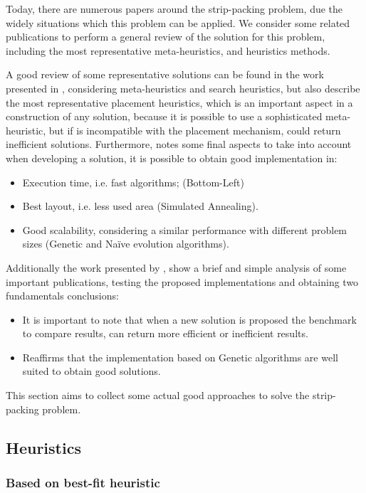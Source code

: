 Today, there are numerous papers around the strip-packing problem,
due the widely situations which this problem can be applied.
We consider some related publications to perform a general review
of the solution for this problem, including the most representative
meta-heuristics, and heuristics methods.

A good review of some representative solutions can be found in the work
presented in \cite{hooper}, considering meta-heuristics and search heuristics,
but also describe the most representative placement heuristics,
which is an important aspect in a construction of any solution,
because it is possible to use a sophisticated meta-heuristic,
but if is incompatible with the placement mechanism,
could return inefficient solutions.
Furthermore, \cite{hooper} notes some final aspects to take into account
when developing a solution, it is possible to obtain good implementation in:
\begin{itemize}
    \item Execution time, i.e. fast algorithms; (Bottom-Left)
    \item Best layout, i.e. less used area (Simulated Annealing).
    \item Good scalability, considering a similar performance with different
        problem sizes (Genetic and Naïve evolution algorithms).
\end{itemize}

Additionally the work presented by \cite{riff},
show a brief and simple analysis of some important
publications, testing the proposed implementations
and obtaining two fundamentals conclusions:
\begin{itemize}
    \item It is important to note that when a new solution is proposed
        the benchmark to compare results, can return more efficient or
        inefficient results.
    \item Reaffirms that the implementation based on Genetic algorithms are well
        suited to obtain good solutions.
\end{itemize}

This section aims to collect some actual good approaches
to solve the strip-packing problem.

\subsection{Heuristics}

\subsubsection{Based on best-fit heuristic}

